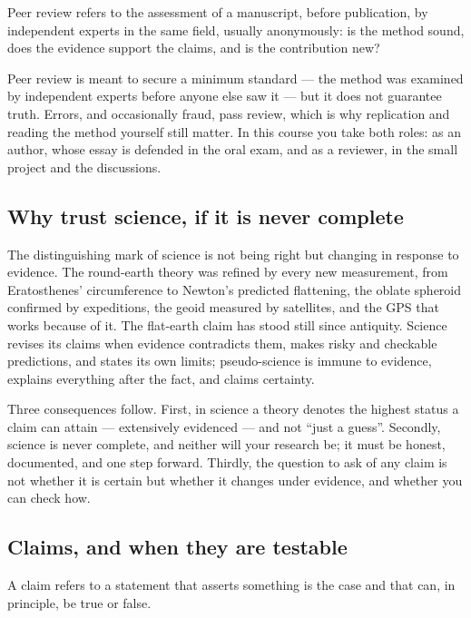 \documentclass[11pt,a4paper,british,twoside=false,headings=small,chapterprefix=false,numbers=noenddot]{scrbook}
\newenvironment{block}[1]{\begin{tcolorbox}[scriptbox, title={#1}]}{\end{tcolorbox}}
\begin{document}
\begin{block}{Peer review}
Peer review refers to the assessment of a manuscript, before publication, by independent experts in the same field, usually anonymously: is the method sound, does the evidence support the claims, and is the contribution new?
\end{block}

Peer review is meant to secure a minimum standard --- the method was examined by independent experts before anyone else saw it --- but it does not guarantee truth. Errors, and occasionally fraud, pass review, which is why replication and reading the method yourself still matter. In this course you take both roles: as an author, whose essay is defended in the oral exam, and as a reviewer, in the small project and the discussions.

\subsection{Why trust science, if it is never complete}

The distinguishing mark of science is not being right but changing in response to evidence. The round-earth theory was refined by every new measurement, from Eratosthenes' circumference to Newton's predicted flattening, the oblate spheroid confirmed by expeditions, the geoid measured by satellites, and the GPS that works because of it. The flat-earth claim has stood still since antiquity. Science revises its claims when evidence contradicts them, makes risky and checkable predictions, and states its own limits; pseudo-science is immune to evidence, explains everything after the fact, and claims certainty.

Three consequences follow. First, in science a theory denotes the highest status a claim can attain --- extensively evidenced --- and not ``just a guess''. Secondly, science is never complete, and neither will your research be; it must be honest, documented, and one step forward. Thirdly, the question to ask of any claim is not whether it is certain but whether it changes under evidence, and whether you can check how.

\subsection{Claims, and when they are testable}

\begin{block}{Claim (thesis)}
A claim refers to a statement that asserts something is the case and that can, in principle, be true or false.
\end{block}
\end{document}
